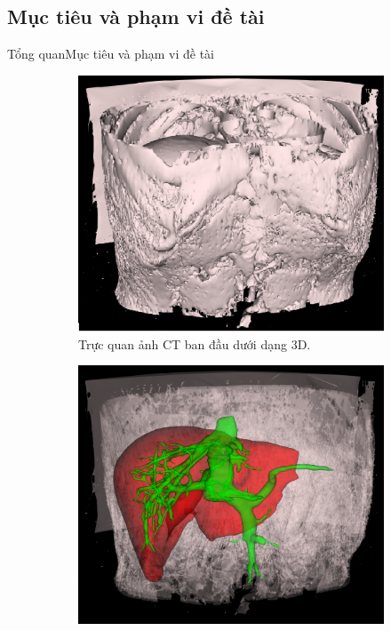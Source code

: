 \documentclass[
	10pt,                %
	aspectratio=169,     %
]{beamer}
\begin{document}
\subsection[Mục tiêu và phạm vi]{Mục tiêu và phạm vi đề tài}
	\begin{frame}{Tổng quan}{Mục tiêu và phạm vi đề tài}
	    \vspace{2mm}
		\begin{figure}[h!]
			\begin{subfigure}[b]{0.47\textwidth}
    			\centering	\includegraphics[scale=0.19]{Presentation_template/figures/volume-3d.png}
    			\vspace{-1mm}
    			\caption{Trực quan ảnh CT ban đầu dưới dạng 3D.}
			\end{subfigure}
			\begin{subfigure}[b]{0.5\textwidth}
    			\centering	\includegraphics[height=.35\textheight]{Presentation_template/figures/liver-vessel-3d.png}

\end{subfigure}
\end{figure}
\end{frame}
\end{document}
